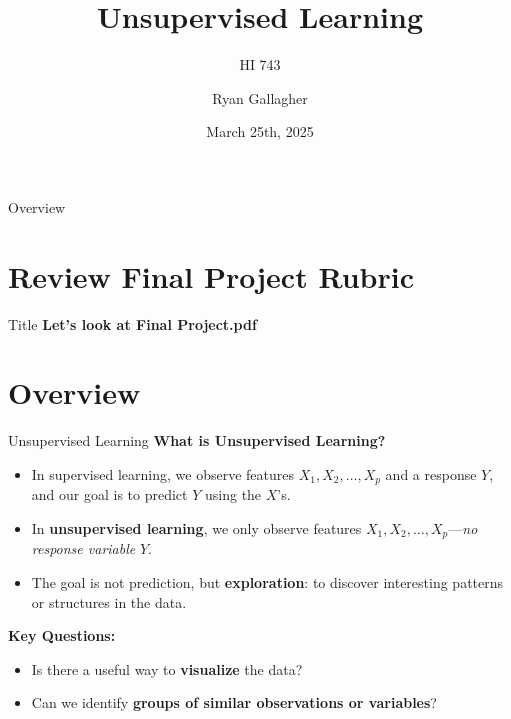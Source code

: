 \documentclass[aspectratio=169,xcolor=dvipsnames]{beamer}
\title{Unsupervised Learning}
\subtitle{HI 743}
\author{Ryan Gallagher}
\institute
{
    Department of Health Informatics and Administration \\
    Zilber College of Public Health \\
    University of Wisconsin - Milwaukee%
}
\date{March 25th, 2025} %
\begin{document}
\begin{frame}
    \titlepage
\end{frame}


\begin{frame}{Overview}
    \tableofcontents
\end{frame}

\section{Review Final Project Rubric}
\begin{frame}{Title}
\centering
\textbf{Let's look at Final Project.pdf}
\end{frame}


\section{Overview}
\begin{frame}{Unsupervised Learning}
  \textbf{What is Unsupervised Learning?}
  \begin{itemize}
    \item In supervised learning, we observe features $X_1, X_2, \ldots, X_p$ and a response $Y$, and our goal is to predict $Y$ using the $X$'s.
    \item In \textbf{unsupervised learning}, we only observe features $X_1, X_2, \ldots, X_p$—\emph{no response variable} $Y$.
    \item The goal is not prediction, but \textbf{exploration}: to discover interesting patterns or structures in the data.
  \end{itemize}

  \vspace{0.3cm}
  \textbf{Key Questions:}
  \begin{itemize}
    \item Is there a useful way to \textbf{visualize} the data?
    \item Can we identify \textbf{groups of similar observations or variables}?
  \end{itemize}

\end{frame}
\end{document}
